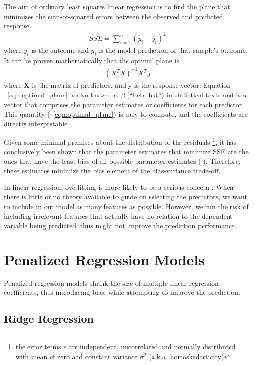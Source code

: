 The aim of ordinary least squares linear regression is to find the plane that
minimizes the sum-of-squared errors between the observed and predicted
response.
\begin{eqnarray}
SSE = \sum_{i=1}^{n}(y_i - \hat{y}_i)^2
\end{eqnarray}
where $y_{i}$ is the outcome and $\hat{y}_i$ is the model prediction of that
sample’s outcome.
It can be proven mathematically  that the optimal plane is
\begin{eqnarray}
    \label{eqn:optimal_plane}
    (X^TX)^{-1}X^{T}y
\end{eqnarray}
where \textbf{X} is the matrix of predictors, and y is the response vector.
Equation ~\ref{eqn:optimal_plane} is also known as $\hat{\beta}$ (“beta-hat”) in statistical texts
and is a vector that comprises the parameter estimates or coefficients for each
predictor. This quantity (~\ref{eqn:optimal_plane}) is easy to compute, and the coefficients are directly
interpretable

Given some minimal premises about the distribution of the residuals \footnote{
the error terms $\epsilon$ are independent, uncorrelated and normally
distributed with mean of zero and constant variance $\sigma^2$ (a.k.a.
homoskedasticity)}, it has conclusively been shown that the parameter estimates
that minimize SSE are the ones that have the least bias of all possible
parameter estimates (\textcite{graybill1976theory} ). Therefore, these estimates
minimize the bias element of the bias-variance trade-off.

In linear regression, overfitting is more likely to be a serious concern
\parencite{harrell2015regression}. When
there is little or no theory available to guide on selecting the predictors, we
want to include in our model as many features as possible. However, we run the
risk of including irrelevant features that actually have no relation to the
dependent variable being predicted, thus might not improve the prediction
performance.

\section{Penalized Regression Models}
\label{sec:penalized_regression_models}

Penalized regression models shrink the size of multiple linear regression
coefficients, thus introducing bias, while attempting to improve the prediction.

\subsection{Ridge Regression}

